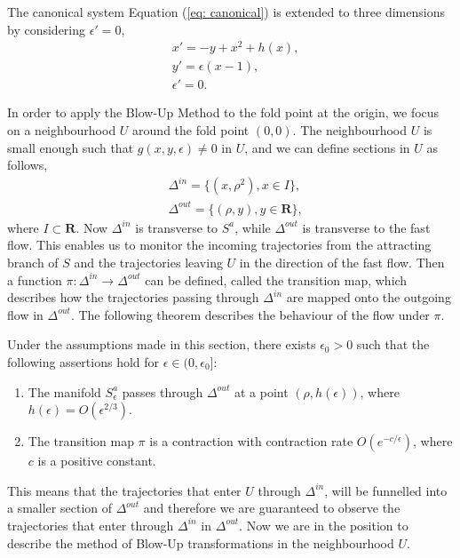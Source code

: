 The canonical system Equation (\ref{eq: canonical}) is extended to three dimensions by considering $\epsilon'=0$, 
\begin{equation} \label{extended FS}
\begin{aligned}
&x'=-y+x^2+h(x), \\
&y'=\epsilon(x-1),\\
&\epsilon'=0.
\end{aligned}
\end{equation}

In order to apply the Blow-Up Method to the fold point at the origin, we focus on a neighbourhood $U$ around the fold point $(0,0)$. The neighbourhood $U$ is small enough such that $g(x,y, \epsilon) \neq 0$ in $U$, and we can define sections in $U$ as follows,
\begin{align*}
&\Delta ^{in} = \{ (x, \rho^2), x \in I \}, \\
&\Delta ^{out} = \{ (\rho, y), y \in \mathbf{R} \},
\end{align*}
where $I \subset \mathbf{R}$. Now $\Delta^{in}$ is transverse to $S^a$, while $\Delta^{out}$ is transverse to the fast flow. This enables us to monitor the incoming trajectories from the attracting branch of $S$ and the trajectories leaving $U$ in the direction of the fast flow.
Then a function $\pi : \Delta^{in} \to \Delta^{out}$ can be defined, called the transition map, which describes how the trajectories passing through $\Delta^{in}$ are mapped onto the outgoing flow in $\Delta^{out}$.  
The following theorem describes the behaviour of the flow under $\pi$.

\begin{theorem} \label{transition map theorem}
Under the assumptions made in this section, there exists $ \epsilon_0 >0$ such that the following assertions hold for $\epsilon \in (0, \epsilon_0]$:\begin{enumerate}
\item  The manifold $S_\epsilon^a$ passes through $\Delta^{out}$ at a point $(\rho, h(\epsilon))$, where $h(\epsilon) = O(\epsilon^{2/3})$.
\item The transition map $\pi$ is a contraction with contraction rate $O(e^{-c/\epsilon})$, where $c$ is a positive constant.
\end{enumerate}
\end{theorem}
This means that the trajectories that enter $U$ through $\Delta^{in}$, will be funnelled into a smaller section of $\Delta^{out}$ and therefore we are guaranteed to observe the trajectories that enter through $\Delta^{in}$ in $\Delta^{out}$. Now we are in the position to describe the method of Blow-Up transformations in the neighbourhood $U$.

